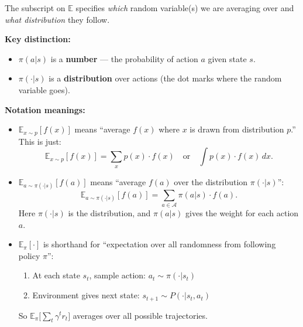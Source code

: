 \begin{remark}
    The subscript on $\mathbb{E}$ specifies \emph{which} random variable(s) we are averaging over and \emph{what distribution} they follow.

    \textbf{Key distinction:}
    \begin{itemize}
        \item $\pi(a|s)$ is a \textbf{number} — the probability of action $a$ given state $s$.
        \item $\pi(\cdot|s)$ is a \textbf{distribution} over actions (the dot marks where the random variable goes).
    \end{itemize}

    \textbf{Notation meanings:}
    \begin{itemize}
        \item $\mathbb{E}_{x \sim p}[f(x)]$ means ``average $f(x)$ where $x$ is drawn from distribution $p$.'' This is just:
              \[
                  \mathbb{E}_{x \sim p}[f(x)] = \sum_{x} p(x) \cdot f(x) \quad \text{or} \quad \int p(x) \cdot f(x) \, dx.
              \]
        \item $\mathbb{E}_{a \sim \pi(\cdot|s)}[f(a)]$ means ``average $f(a)$ over the distribution $\pi(\cdot|s)$'':
              \[
                  \mathbb{E}_{a \sim \pi(\cdot|s)}[f(a)] = \sum_{a \in \mathcal{A}} \pi(a|s) \cdot f(a).
              \]
              Here $\pi(\cdot|s)$ is the distribution, and $\pi(a|s)$ gives the weight for each action $a$.
        \item $\mathbb{E}_\pi[\cdot]$ is shorthand for ``expectation over all randomness from following policy $\pi$'':
              \begin{enumerate}
                  \item At each state $s_t$, sample action: $a_t \sim \pi(\cdot|s_t)$
                  \item Environment gives next state: $s_{t+1} \sim P(\cdot|s_t, a_t)$
              \end{enumerate}
              So $\mathbb{E}_\pi\bigl[\sum_t \gamma^t r_t\bigr]$ averages over all possible trajectories.
    \end{itemize}
\end{remark}

